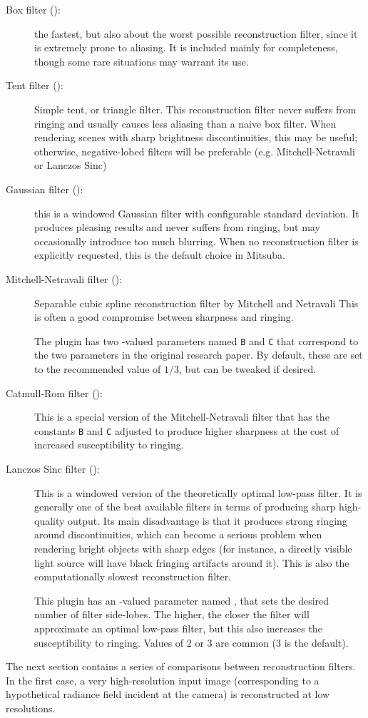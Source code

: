 \begin{description}
\item[Box filter ():]
the fastest, but also about the worst possible 
reconstruction filter, since it is extremely prone to aliasing. 
It is included mainly for completeness, though some rare situations
may warrant its use.
\item[Tent filter ():]
Simple tent, or triangle filter. This reconstruction filter never
suffers from ringing and usually causes less aliasing than a naive 
box filter. When rendering scenes with sharp brightness discontinuities,
this may be useful; otherwise, negative-lobed filters will be preferable
(e.g. Mitchell-Netravali or Lanczos Sinc)

\item[Gaussian filter ():]
this is a windowed Gaussian filter with configurable standard deviation.
It produces pleasing results and never suffers from ringing, but may 
occasionally introduce too much blurring.
When no reconstruction filter is explicitly requested, this is the default
choice in Mitsuba.
\item[Mitchell-Netravali filter ():]
Separable cubic spline reconstruction filter by Mitchell and Netravali
\cite{Mitchell:1988:Reconstruction}
This is often a good compromise between sharpness and ringing. 

The plugin has two -valued parameters named \texttt{B} and \texttt{C} that 
correspond to the two parameters in the original research paper. By default, these
are set to the recommended value of $1/3$, but can be tweaked if desired.

\item[Catmull-Rom filter ():]
This is a special version of the Mitchell-Netravali filter that has the 
constants \texttt{B} and \texttt{C} adjusted to produce higher sharpness at the
cost of increased susceptibility to ringing.

\item[Lanczos Sinc filter ():]
This is a windowed version of the theoretically optimal low-pass filter.
It is generally one of the best available filters in terms of producing sharp 
high-quality output. Its main disadvantage is that it produces strong ringing around 
discontinuities, which can become a serious problem when rendering bright objects 
with sharp edges (for instance, a directly visible light source will have black 
fringing artifacts around it). 
This is also the computationally slowest reconstruction filter.

This plugin has an -valued parameter named , that
sets the desired number of filter side-lobes. The higher, the closer
the filter will approximate an optimal low-pass filter, but this also
increases the susceptibility to ringing. Values of 2 or 3 are common (3 is the default).
\end{description}
The next section contains a series of comparisons between reconstruction filters. In the first 
case, a very high-resolution input image (corresponding to a hypothetical radiance field 
incident at the camera) is reconstructed at low resolutions.

